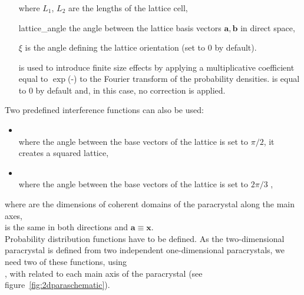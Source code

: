 \FloatBarrier

\newpage%
\subsubsection{ } 
\begin{itemize}
\item[where] $L_1$, $L_2$ are the lengths of the lattice cell,
\item[] lattice\_angle the angle between the lattice basis vectors $\mathbf{a}, \mathbf{b}$ in direct space,
\item[] $\xi$ is the angle defining the lattice orientation (set to $0$ by default).
\item[]  is used to introduce finite size effects by applying a multiplicative coefficient equal to  $\exp$(-) to the Fourier transform of the probability densities.  is equal to 0 by default and, in this case, no correction is applied.
\end{itemize}
Two predefined interference functions can also be used:
\begin{itemize}
\item  {}\\
where the angle between the base vectors of the lattice is set to $\pi/2$,
it creates a squared lattice,
\item {}\\
where the angle between the base vectors of the lattice is set to $2\pi/3$ ,
\end{itemize}
where
 are the dimensions of coherent domains of the paracrystal along the main axes,\\  is the same in both directions and $\mathbf{a}\equiv \mathbf{x}$.\\

Probability distribution functions have to be defined. As the two-dimensional paracrystal is defined from two independent one-dimensional paracrystals, we need two of these functions, using\\ , with  related to each main axis of the paracrystal (see figure~\ref{fig:2dparaschematic}).


